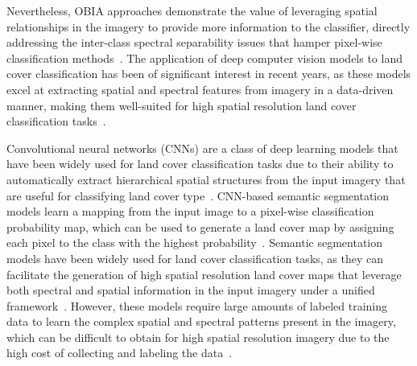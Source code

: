 Nevertheless, OBIA approaches demonstrate the value of leveraging spatial relationships in the imagery to provide more information to the classifier, directly addressing the inter-class spectral separability issues that hamper pixel-wise classification methods~\citep{blaschkeObjectOrientedImageProcessing2000a, myintPerpixelVsObjectbased2011, tehranyComparativeAssessmentObject2014}.
The application of deep computer vision models to land cover classification has been of significant interest in recent years, as these models excel at extracting spatial and spectral features from imagery in a data-driven manner, making them well-suited for high spatial resolution land cover classification tasks~\citep{zhuDeepLearningRemote2017a, maDeepLearningRemote2019, valiDeepLearningLand2020}.


Convolutional neural networks (CNNs) are a class of deep learning models that have been widely used for land cover classification tasks due to their ability to automatically extract hierarchical spatial structures from the input imagery that are useful for classifying land cover type~\citep{liSurveyConvolutionalNeural2022a, songPatchBasedLightConvolutional2019, panLandcoverClassificationMultispectral2020,kussulDeepLearningClassification2017}.
CNN-based semantic segmentation models learn a mapping from the input image to a pixel-wise classification probability map, which can be used to generate a land cover map by assigning each pixel to the class with the highest probability~\citep{longFullyConvolutionalNetworks2015}.
Semantic segmentation models have been widely used for land cover classification tasks, as they can facilitate the generation of high spatial resolution land cover maps that leverage both spectral and spatial information in the input imagery under a unified framework~\citep{yuanReviewDeepLearning2021}.
However, these models require large amounts of labeled training data to learn the complex spatial and spectral patterns present in the imagery, which can be difficult to obtain for high spatial resolution imagery due to the high cost of collecting and labeling the data~\citep{huTransferringDeepConvolutional2015}.

